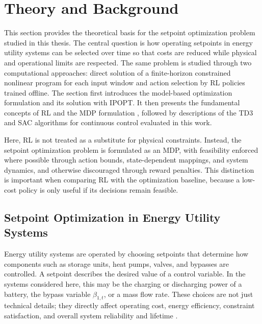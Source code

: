 \documentclass[12pt]{article}
\newcommand{\startnewpage}{\clearpage}
\begin{document}
\startnewpage
\section{Theory and Background}
\label{sec:theory_background}

This section provides the theoretical basis for the setpoint optimization problem studied in this thesis. The central question is how operating setpoints in energy utility systems can be selected over time so that costs are reduced while physical and operational limits are respected. The same problem is studied through two computational approaches: direct solution of a finite-horizon constrained nonlinear program for each input window and action selection by RL policies trained offline. The section first introduces the model-based optimization formulation and its solution with IPOPT. It then presents the fundamental concepts of RL and the MDP formulation \cite{sutton2018reinforcement}, followed by descriptions of the TD3 \cite{fujimoto2018addressing} and SAC \cite{haarnoja2018soft} algorithms for continuous control evaluated in this work.

Here, RL is not treated as a substitute for physical constraints. Instead, the setpoint optimization problem is formulated as an MDP, with feasibility enforced where possible through action bounds, state-dependent mappings, and system dynamics, and otherwise discouraged through reward penalties. This distinction is important when comparing RL with the optimization baseline, because a low-cost policy is only useful if its decisions remain feasible.

\subsection{Setpoint Optimization in Energy Utility Systems}

Energy utility systems are operated by choosing setpoints that determine how components such as storage units, heat pumps, valves, and bypasses are controlled. A setpoint describes the desired value of a control variable. In the systems considered here, this may be the charging or discharging power of a battery, the bypass variable $\beta_{1,t}$, or a mass flow rate. These choices are not just technical details; they directly affect operating cost, energy efficiency, constraint satisfaction, and overall system reliability and lifetime \cite{tran2025safe}.
\end{document}
